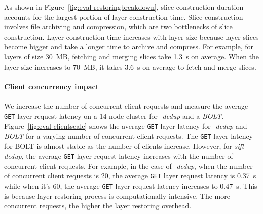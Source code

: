 As shown in Figure~\ref{fig:eval-restoringbreakdown}, slice construction duration accounts for the largest portion of layer construction time.
Slice construction involves file archiving and compression, which are two bottlenecks of slice construction. 
Layer construction time increases with layer size because layer slices become bigger and take a longer time to archive and compress.
For example, for layers of size 30~MB, fetching and merging slices take 1.3~s on average.
When the layer size increases to 70~MB, it takes 3.6~s on average to fetch and merge slices.

\paragraph{Client concurrency impact}
We increase the number of concurrent client requests and measure the average \texttt{GET} layer request latency on a 14-node cluster for \emph{\sysname-dedup} and a \emph{BOLT}.
%
Figure~\ref{fig:eval-clientscale} shows
the average \texttt{GET} layer latency for \emph{\sysname-dedup} and \emph{BOLT} for a varying number of concurrent client requests.
The \texttt{GET} layer latency for BOLT is almost stable as the number of clients increase.
However, for \emph{sift-dedup}, the average \texttt{GET} layer request latency increases with the number of concurrent client requests.
For example, in the case of \emph{\sysname-dedup}, when the number of concurrent client requests is 20, the average \texttt{GET} layer request latency is 0.37~s while when it's 60, the average \texttt{GET} layer request latency  increases to 0.47~s.
This is because layer restoring process is computationally intensive.
The more concurrent requests, the higher the layer restoring overhead.

